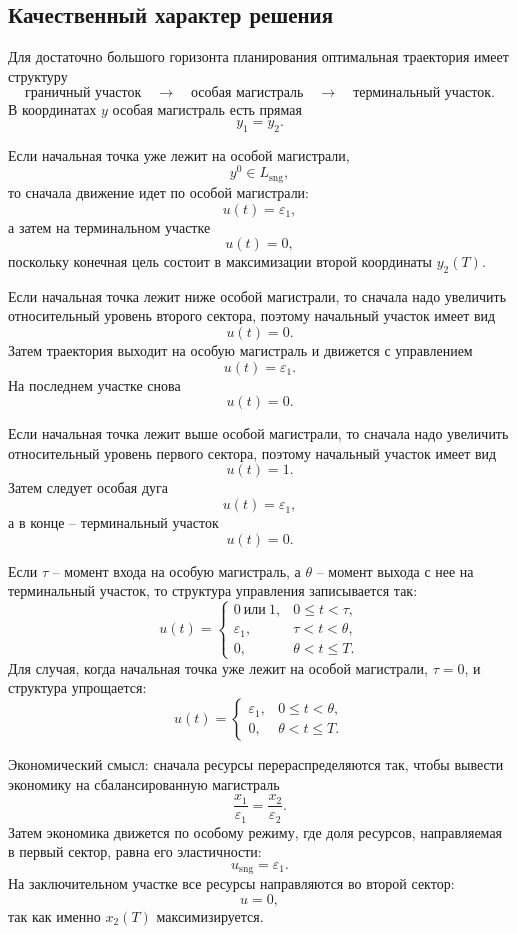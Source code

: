 \documentclass[12pt,a4paper]{article}
\newcommand{\eps}{\varepsilon}
\newcommand{\sng}{\mathrm{sng}}
\begin{document}
\subsection{Качественный характер решения}

Для достаточно большого горизонта планирования оптимальная траектория имеет структуру
\[
    \text{граничный участок}
    \quad\longrightarrow\quad
    \text{особая магистраль}
    \quad\longrightarrow\quad
    \text{терминальный участок}.
\]
В координатах \(y\) особая магистраль есть прямая
\[
    y_1=y_2.
\]

Если начальная точка уже лежит на особой магистрали,
\[
    y^0\in L_{\sng},
\]
то сначала движение идет по особой магистрали:
\[
    u(t)=\eps_1,
\]
а затем на терминальном участке
\[
    u(t)=0,
\]
поскольку конечная цель состоит в максимизации второй координаты \(y_2(T)\).

Если начальная точка лежит ниже особой магистрали, то сначала надо увеличить относительный уровень второго сектора, поэтому начальный участок имеет вид
\[
    u(t)=0.
\]
Затем траектория выходит на особую магистраль и движется с управлением
\[
    u(t)=\eps_1.
\]
На последнем участке снова
\[
    u(t)=0.
\]

Если начальная точка лежит выше особой магистрали, то сначала надо увеличить относительный уровень первого сектора, поэтому начальный участок имеет вид
\[
    u(t)=1.
\]
Затем следует особая дуга
\[
    u(t)=\eps_1,
\]
а в конце -- терминальный участок
\[
    u(t)=0.
\]

Если \(\tau\) -- момент входа на особую магистраль, а \(\theta\) -- момент выхода с нее на терминальный участок, то структура управления записывается так:
\[
    u(t)=
    \begin{cases}
        0\ \text{или}\ 1, & 0\le t<\tau,\\
        \eps_1, & \tau<t<\theta,\\
        0, & \theta<t\le T.
    \end{cases}
\]
Для случая, когда начальная точка уже лежит на особой магистрали, \(\tau=0\), и структура упрощается:
\[
    u(t)=
    \begin{cases}
        \eps_1, & 0\le t<\theta,\\
        0, & \theta<t\le T.
    \end{cases}
\]

Экономический смысл: сначала ресурсы перераспределяются так, чтобы вывести экономику на сбалансированную магистраль
\[
    \frac{x_1}{\eps_1}=\frac{x_2}{\eps_2}.
\]
Затем экономика движется по особому режиму, где доля ресурсов, направляемая в первый сектор, равна его эластичности:
\[
    u_{\sng}=\eps_1.
\]
На заключительном участке все ресурсы направляются во второй сектор:
\[
    u=0,
\]
так как именно \(x_2(T)\) максимизируется.
\end{document}
